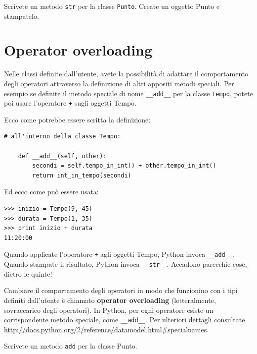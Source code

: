 \documentclass[10pt]{book}
\begin{document}
\vspace{0.2in}
\begin{exercise}

Scrivete un metodo {\tt str} per la classe {\tt Punto}.  Create un oggetto Punto e stampatelo.

\end{exercise}


\section{Operator overloading}
\label{operator.overloading}

Nelle classi definite dall'utente, avete la possibilità di adattare il comportamento degli operatori attraverso la definizione di altri appositi metodi speciali. Per esempio se definite il metodo speciale di nome \verb"__add__" per la classe {\tt Tempo}, potete poi usare l'operatore {\tt +} sugli oggetti Tempo.

Ecco come potrebbe essere scritta la definizione:

\begin{verbatim}
# all'interno della classe Tempo:

    def __add__(self, other):
        secondi = self.tempo_in_int() + other.tempo_in_int()
        return int_in_tempo(secondi)
\end{verbatim}
%
Ed ecco come può essere usata:

\begin{verbatim}
>>> inizio = Tempo(9, 45)
>>> durata = Tempo(1, 35)
>>> print inizio + durata
11:20:00
\end{verbatim}
%
Quando applicate l'operatore {\tt +} agli oggetti Tempo, Python invoca
\verb"__add__".  Quando stampate il risultato, Python invoca 
\verb"__str__".  Accadono parecchie cose, dietro le quinte!

Cambiare il comportamento degli operatori in modo che funzionino con i tipi definiti dall'utente è chiamato {\bf operator overloading} (letteralmente, sovraccarico degli operatori). In Python, per ogni operatore esiste un corrispondente metodo speciale, come
\verb"__add__".  Per ulteriori dettagli consultate
\url{http://docs.python.org/2/reference/datamodel.html#specialnames}.

\vspace{0.2in}
\begin{exercise}

Scrivete un metodo {\tt add} per la classe Punto.  

\end{exercise}
\end{document}
